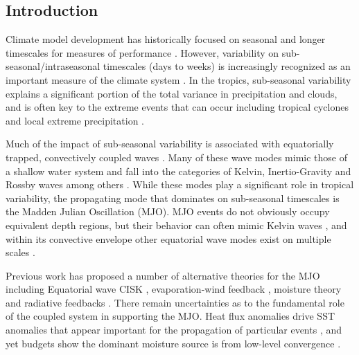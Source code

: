 \documentclass[draft,ms]{AGUTeX}
\begin{document}
%
%

%
\begin{article}
%
%

\section{Introduction}
\label{sec:intro}
Climate model development has historically focused on seasonal and longer timescales for measures of performance \citep{Gent2011,Li2014}. However, variability on sub-seasonal/intraseasonal timescales (days to weeks) is increasingly recognized as an important measure of the climate system \citep{Lin2006,Ahn2017}. In the tropics, sub-seasonal variability explains a significant portion of the total variance in precipitation and clouds, and is often key to the extreme events that can occur including tropical cyclones \citep{Ventrice2012} and local extreme precipitation \citep{Julia2012}. 

Much of the impact of sub-seasonal variability is associated with equatorially trapped, convectively coupled waves \citep{Wheeler1999}. Many of these wave modes mimic those of a shallow water system and fall into the categories of Kelvin, Inertio-Gravity and Rossby waves among others \citep{Matsuno1966}. While these modes play a significant role in tropical variability, the propagating mode that dominates on sub-seasonal timescales is the Madden Julian Oscillation (MJO). MJO events do not obviously occupy equivalent depth regions, but their behavior can often mimic Kelvin waves \citep{Roundy2012}, and within its convective envelope other equatorial wave modes exist on multiple scales \citep{Kikuchi2010}.

Previous work has proposed a number of alternative theories for the MJO including Equatorial wave CISK \citep{Hayashi1970,Benedict2007}, evaporation-wind feedback \citep{Neelin1987}, moisture theory \citep{Adames2016,Sobel2013} and radiative feedbacks \citep{Kim2015}. There remain uncertainties as to the fundamental role of the coupled system in supporting the MJO. Heat flux anomalies drive SST anomalies that appear important for the propagation of particular events \citep{Krishnamurti1988}, and yet budgets show the dominant moisture source is from low-level convergence \citep{DeSzoeke2015}.


\end{article}
\end{document}
